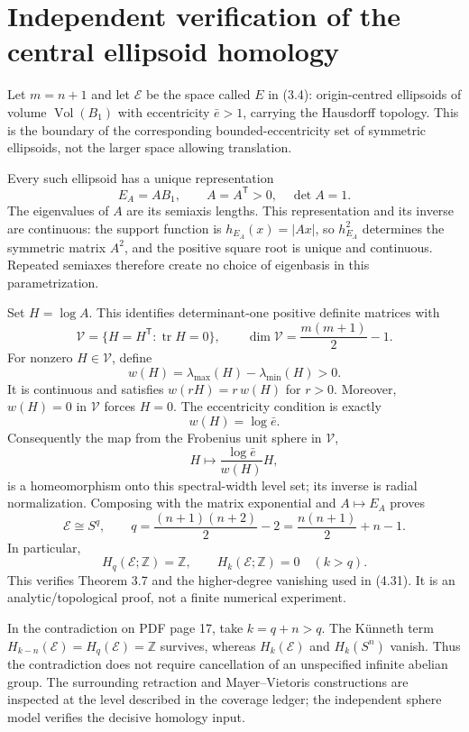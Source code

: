 \documentclass[10pt]{article}
\begin{document}
\section*{Independent verification of the central ellipsoid homology}
Let \(m=n+1\) and let \(\mathcal E\) be the space called \(E\) in (3.4): origin-centred ellipsoids of volume \(\operatorname{Vol}(B_1)\) with eccentricity \(\bar e>1\), carrying the Hausdorff topology. This is the boundary of the corresponding bounded-eccentricity set of symmetric ellipsoids, not the larger space allowing translation.\par
Every such ellipsoid has a unique representation \[E_A=A B_1,\qquad A=A^{\mathsf T}>0,\quad \det A=1.\] The eigenvalues of \(A\) are its semiaxis lengths. This representation and its inverse are continuous: the support function is \(h_{E_A}(x)=|Ax|\), so \(h_{E_A}^2\) determines the symmetric matrix \(A^2\), and the positive square root is unique and continuous. Repeated semiaxes therefore create no choice of eigenbasis in this parametrization.\par
Set \(H=\log A\). This identifies determinant-one positive definite matrices with \[\mathcal V=\{H=H^{\mathsf T}:\operatorname{tr}H=0\},
\qquad \dim\mathcal V=\frac{m(m+1)}2-1.\] For nonzero \(H\in\mathcal V\), define \[w(H)=\lambda_{\max}(H)-\lambda_{\min}(H)>0.\] It is continuous and satisfies \(w(rH)=r\,w(H)\) for \(r>0\). Moreover, \(w(H)=0\) in \(\mathcal V\) forces \(H=0\). The eccentricity condition is exactly \[w(H)=\log\bar e.\] Consequently the map from the Frobenius unit sphere in \(\mathcal V\), \[H\longmapsto \frac{\log\bar e}{w(H)}H,\] is a homeomorphism onto this spectral-width level set; its inverse is radial normalization. Composing with the matrix exponential and \(A\mapsto E_A\) proves \[\mathcal E\cong S^q,\qquad
q=\frac{(n+1)(n+2)}2-2
  =\frac{n(n+1)}2+n-1.\] In particular, \[H_q(\mathcal E;\mathbb Z)=\mathbb Z,\qquad
H_k(\mathcal E;\mathbb Z)=0\quad(k>q).\] This verifies Theorem 3.7 and the higher-degree vanishing used in (4.31). It is an analytic/topological proof, not a finite numerical experiment.\par
In the contradiction on PDF page 17, take \(k=q+n>q\). The Künneth term \(H_{k-n}(\mathcal E)=H_q(\mathcal E)=\mathbb Z\) survives, whereas \(H_k(\mathcal E)\) and \(H_k(S^n)\) vanish. Thus the contradiction does not require cancellation of an unspecified infinite abelian group. The surrounding retraction and Mayer–Vietoris constructions are inspected at the level described in the coverage ledger; the independent sphere model verifies the decisive homology input.\par
\end{document}

